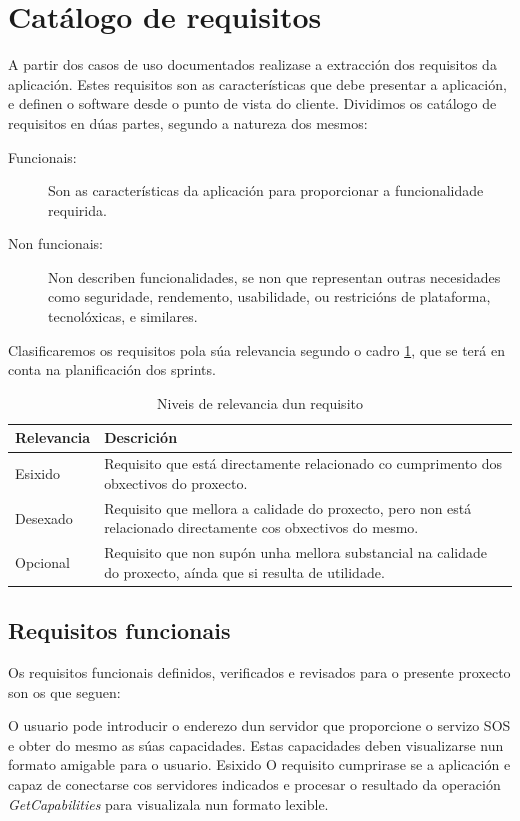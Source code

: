 \section{Catálogo de requisitos}
A partir dos casos de uso documentados realizase a extracción dos requisitos da aplicación. Estes requisitos son as características que debe presentar a aplicación, e definen o software desde o punto de vista do cliente. Dividimos os catálogo de requisitos en dúas partes, segundo a natureza dos mesmos:
\begin{description}
\item[Funcionais:] Son as características da aplicación para proporcionar a funcionalidade requirida.
\item[Non funcionais:] Non describen funcionalidades, se non que representan outras necesidades como seguridade, rendemento, usabilidade, ou restricións de plataforma, tecnolóxicas, e similares.
\end{description}

Clasificaremos os requisitos pola súa relevancia segundo o cadro \ref{tab:relevanciaReq}, que se terá en conta na planificación dos sprints.
\begin{table}
\begin{tabularx}{\textwidth}{lX} \toprule
	Relevancia & Descrición \\
	\midrule
	Esixido & Requisito que está directamente relacionado co cumprimento dos obxectivos do proxecto.\\
	Desexado & Requisito que mellora a calidade do proxecto, pero non está relacionado directamente cos obxectivos do mesmo.\\
	Opcional &  Requisito que non supón unha mellora substancial na calidade do proxecto, aínda que si resulta de utilidade.\\
	\bottomrule
\end{tabularx}
\caption{Niveis de relevancia dun requisito}
\label{tab:relevanciaReq}
\end{table}

\subsection{Requisitos funcionais}
Os requisitos funcionais definidos, verificados e revisados para o presente proxecto son os que seguen:

		  	{O usuario pode introducir o enderezo dun servidor que proporcione o servizo SOS e obter do mesmo as súas capacidades. Estas capacidades deben visualizarse nun formato amigable para o usuario.}%
			{Esixido}%
			{O requisito cumprirase se a aplicación e capaz de conectarse cos servidores indicados e procesar o resultado da operación \emph{GetCapabilities} para visualizala nun formato lexible.}%
			
